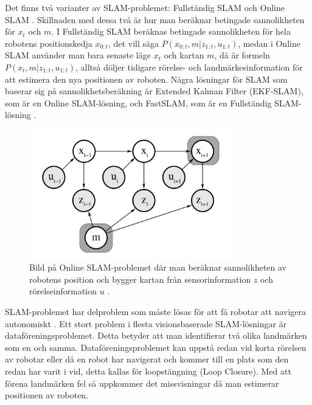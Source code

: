 Det finns två varianter av SLAM-problemet: Fullständig SLAM och Online SLAM \citep{ProbabilisticRobotics}. Skillnaden med dessa två är hur man beräknar betingade sannolikheten för $x_t$ och $m$. I Fullständig SLAM beräknas betingade sannolikheten för hela robotens positionskedja $x_{0:t}$, det vill säga $P(x_{0:t}, m | z_{1:t}, u_{1:t})$, medan i Online SLAM använder man bara senaste läge $x_{t}$ och kartan $m$, då är formeln $P(x_t, m | z_{1:t}, u_{1:t})$, alltså döljer tidigare rörelse- och landmärkesinformation för att estimera den nya positionen av roboten. Några lösningar för SLAM som baserar sig på sannolikhetsberäkning är Extended Kalman Filter (EKF-SLAM), som är en Online SLAM-lösning, och FastSLAM, som är en Fullständig SLAM-lösning \citep{realslamproblem, ProbabilisticRobotics}. 

\begin{figure}[ht]
    \begin{center}
    \includegraphics[width=0.8\textwidth]{online-slam.JPG}
    \caption{Bild på Online SLAM-problemet där man beräknar sannolikheten av robotens position och bygger kartan från sensorinformation $z$ och rörelseinformation $u$ \citep{ProbabilisticRobotics}.}
    \label{slam-problemet}
    \end{center}
\end{figure}

SLAM-problemet har delproblem som måste lösas för att få robotar att navigera autonomiskt \citep{slamproblem}. Ett stort problem i flesta visionsbaserade SLAM-lösningar är dataföreningsproblemet. Detta betyder att man identifierar två olika landmärken som en och samma. Dataföreningsproblemet kan uppstå redan vid korta rörelsen av robotar eller då en robot har navigerat och kommer till en plats som den redan har varit i vid, detta kallas för loopstängning (Loop Closure). Med att förena landmärken fel så uppkommer det missvisningar då man estimerar positionen av roboten.

